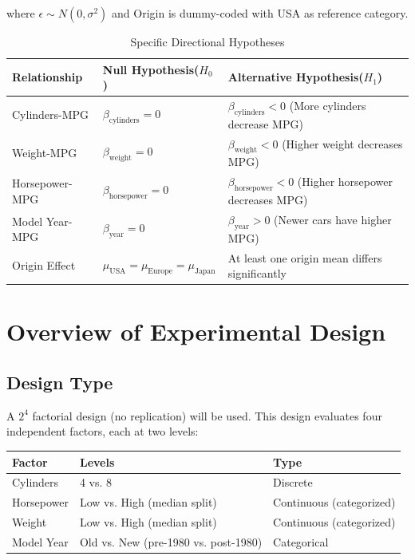 \documentclass[12pt]{article}
\begin{document}
\noindent where $\epsilon \sim N(0,\sigma^2)$ and Origin is dummy-coded with USA as reference category.

\begin{table}[!h]
\centering
\caption{Specific Directional Hypotheses}
\label{tab:directional_hypotheses}
\begin{tabular}{p{3cm}p{4.5cm}p{7cm}}
\toprule
\textbf{Relationship} & \textbf{Null Hypothesis($H_0$)} & \textbf{Alternative Hypothesis($H_1$)} \\
\midrule
Cylinders-MPG & $\beta_{\text{cylinders}} = 0$ & $\beta_{\text{cylinders}} < 0$ \newline (More cylinders decrease MPG) \\
\midrule
Weight-MPG & $\beta_{\text{weight}} = 0$ & $\beta_{\text{weight}} < 0$ \newline (Higher weight decreases MPG) \\
\midrule
Horsepower-MPG & $\beta_{\text{horsepower}} = 0$ & $\beta_{\text{horsepower}} < 0$ \newline (Higher horsepower decreases MPG) \\
\midrule
Model Year-MPG & $\beta_{\text{year}} = 0$ & $\beta_{\text{year}} > 0$ \newline (Newer cars have higher MPG) \\
\midrule
Origin Effect & $\mu_{\text{USA}} = \mu_{\text{Europe}} = \mu_{\text{Japan}}$ & At least one origin mean differs significantly \\
\bottomrule
\end{tabular}
\end{table}

\clearpage

\section{Overview of Experimental Design}

\subsection{Design Type}

A $2^4$ factorial design (no replication) will be used. This design evaluates four independent factors, each at two levels:

\begin{table}[!h]
\centering
\begin{tabular}{lll}
\toprule
\textbf{Factor} & \textbf{Levels} & \textbf{Type} \\
\midrule
Cylinders & 4 vs. 8 & Discrete \\
Horsepower & Low vs. High (median split) & Continuous (categorized) \\
Weight & Low vs. High (median split) & Continuous (categorized) \\
Model Year & Old vs. New (pre-1980 vs. post-1980) & Categorical \\
\bottomrule
\end{tabular}
\end{table}
\end{document}
